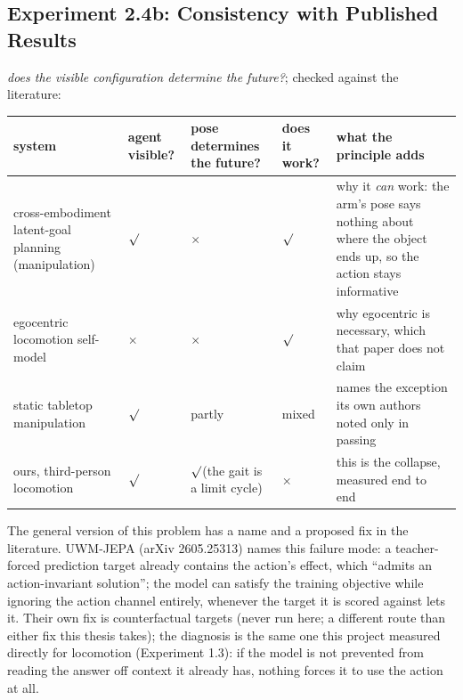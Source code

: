 \documentclass[12pt,a4paper,oneside]{report}
\providecommand{\checkmark}{\ensuremath{\surd}}
\newcommand{\yes}{\ensuremath{\checkmark}}
\newcommand{\no}{\ensuremath{\times}}
\begin{document}
\subsection{Experiment 2.4b: Consistency with Published Results}


\emph{does the visible configuration determine the future?}; checked against the literature:


\begin{center}
\footnotesize
\setlength{\tabcolsep}{3pt}
\begin{tabularx}{\textwidth}{>{\hsize}Y>{\hsize\centering\arraybackslash}Y>{\hsize\centering\arraybackslash}Y>{\hsize\centering\arraybackslash}Y>{\hsize}Y}
\toprule
\textbf{system} & \textbf{agent visible?} & \textbf{pose determines the future?} & \textbf{does it work?} & \textbf{what the principle adds} \\
\midrule
cross-embodiment latent-goal planning (manipulation) & \yes & \no & \yes & why it \emph{can} work: the arm's pose says nothing about where the object ends up, so the action stays informative \\
\addlinespace[3pt]
egocentric locomotion self-model & \no & \no & \yes & why egocentric is necessary, which that paper does not claim \\
\addlinespace[3pt]
static tabletop manipulation & \yes & partly & mixed & names the exception its own authors noted only in passing \\
\addlinespace[3pt]
ours, third-person locomotion & \yes & \yes (the gait is a limit cycle) & \no & this is the collapse, measured end to end \\
\bottomrule
\end{tabularx}
\end{center}

The general version of this problem has a name and a proposed fix in the literature. UWM-JEPA (arXiv 2605.25313) names this failure mode: a teacher-forced prediction target already contains the action's effect, which ``admits an action-invariant solution''; the model can satisfy the training objective while ignoring the action channel entirely, whenever the target it is scored against lets it. Their own fix is counterfactual targets (never run here; a different route than either fix this thesis takes); the diagnosis is the same one this project measured directly for locomotion (Experiment 1.3): if the model is not prevented from reading the answer off context it already has, nothing forces it to use the action at all.
\end{document}
